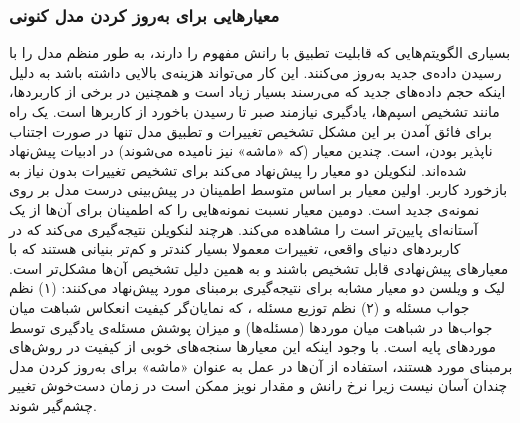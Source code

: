 \subsubsection{
معیارهایی برای به‌روز کردن مدل کنونی
}
بسیاری الگویتم‌هایی که قابلیت تطبیق با رانش مفهوم را دارند، به طور منظم مدل را با رسیدن داده‌ی جدید به‌روز می‌کنند. این کار می‌تواند هزینه‌ی بالایی داشته باشد به دلیل اینکه حجم داده‌های جدید که می‌رسند بسیار زیاد است و همچنین در برخی از کاربردها، مانند تشخیص اسپم‌ها، یادگیری نیازمند صبر تا رسیدن باخورد
از کاربرها است. یک راه برای فائق آمدن بر این مشکل تشخیص تغییرات و تطبیق مدل تنها در صورت اجتناب ناپذیر بودن، است. چندین معیار
(که «ماشه»
 نیز نامیده می‌شوند) در ادبیات پیش‌نهاد شده‌اند. لنکویلن
\cite{lanquillonrenz1999} 
دو معیار را پیش‌نهاد می‌کند برای تشخیص تغییرات بدون نیاز به بازخورد کاربر. اولین معیار بر اساس متوسط اطمینان
در پیش‌بینی درست مدل بر روی نمونه‌ی جدید است. دومین معیار نسبت نمونه‌هایی را که اطمینان برای آن‌ها از یک آستانه‌ای
پایین‌تر است را مشاهده می‌کند. هرچند لنکویلن نتیجه‌گیری می‌کند که در کاربردهای دنیای واقعی، تغییرات معمولا بسیار کندتر و کم‌تر بنیانی
هستند که با معیارهای پیش‌نهادی قابل تشخیص باشند و به همین دلیل تشخیص آن‌ها مشکل‌تر است. لیک و ویلسن
\cite{leakewilson1999} 
دو معیار مشابه برای نتیجه‌گیری برمبنای مورد پیش‌نهاد می‌کنند: (۱) نظم جواب مسئله
و (۲) نظم توزیع مسئله
، 
که نمایان‌گر کیفیت انعکاس شباهت میان جواب‌ها در شباهت میان موردها (مسئله‌ها) و میزان پوشش
مسئله‌ی یادگیری توسط موردهای پایه است. با وجود اینکه این معیارها سنجه‌های
خوبی از کیفیت در روش‌های برمبنای مورد هستند، استفاده از آن‌ها در عمل به عنوان «ماشه» برای به‌روز کردن مدل چندان آسان نیست زیرا نرخ رانش و مقدار نویز ممکن است در زمان دست‌خوش تغییر چشم‌گیر شوند.